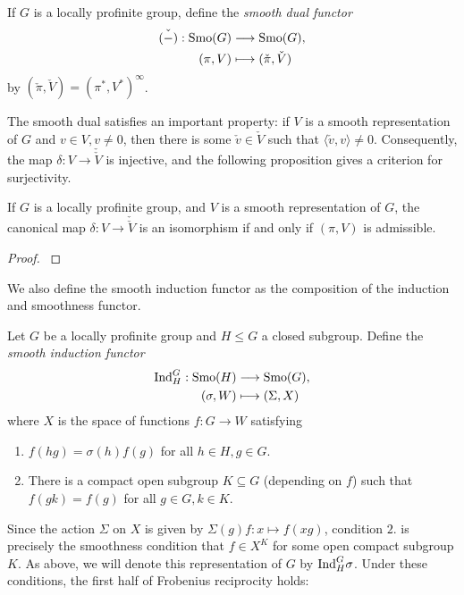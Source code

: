 \begin{defn}
    If $G$ is a locally profinite group, define the \textit{smooth dual functor} 
    \begin{align*}
        \check{(-)}:\mathrm{Smo}(G)&\longrightarrow\mathrm{Smo}(G),\\
        (\pi,V)&\longmapsto(\check{\pi},\check{V})
    \end{align*}
    by $(\check{\pi},\check{V})=(\pi^*,V^*)^\infty$.
\end{defn}

The smooth dual satisfies an important property: if $V$ is a smooth representation of $G$ and $v\in V, v\neq 0$, then there is some $\check{v}\in\check{V}$ such that $\langle\check{v},v\rangle\neq 0$. Consequently, the map $\delta:V\rightarrow\check{\check{V}}$ is injective, and the following proposition gives a criterion for surjectivity.

\begin{prop}
    If $G$ is a locally profinite group, and $V$ is a smooth representation of $G$, the canonical map $\delta:V\longrightarrow\check{\check{V}}$ is an isomorphism if and only if $(\pi,V)$ is admissible.
\end{prop}
\begin{proof}
    \cite[Proposition 2.9]{BH1}
\end{proof}

We also define the smooth induction functor as the composition of the induction and smoothness functor.

\begin{defn}\label{induction}
    Let $G$ be a locally profinite group and $H\leq G$ a closed subgroup. Define the \textit{smooth induction functor}
    \begin{align*}
        \mathrm{Ind}_H^G:\mathrm{Smo}(H)&\longrightarrow\mathrm{Smo}(G),\\
        (\sigma,W)&\longmapsto(\Sigma,X)
    \end{align*}
    where $X$ is the space of functions $f: G\to W$ satisfying
	\begin{enumerate}
		\item $f(hg) = \sigma(h)f(g)$ for all $h\in H, g\in G$.
		\item There is a compact open subgroup $K\subseteq G$ (depending on $f$) such that $f(gk) = f(g)$ for all $g\in G, k\in K$.
	\end{enumerate}
\end{defn}

Since the action $\Sigma$ on $X$ is given by $\Sigma(g)f:x\mapsto f(xg)$, condition $2.$ is precisely the smoothness condition that $f\in X^K$ for some open compact subgroup $K$. As above, we will denote this representation of $G$ by $\mathrm{Ind}_H^G\sigma$. Under these conditions, the first half of Frobenius reciprocity holds:

